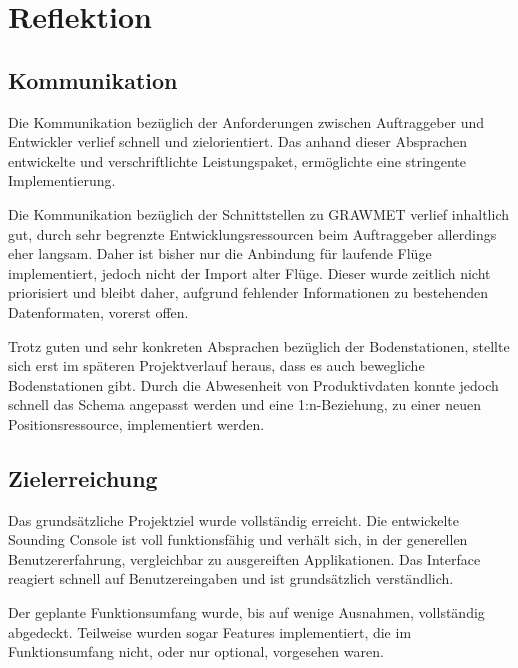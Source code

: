 \section{Reflektion}

\subsection{Kommunikation}
Die Kommunikation bezüglich der Anforderungen zwischen Auftraggeber und Entwickler verlief schnell und zielorientiert.
Das anhand dieser Absprachen entwickelte und verschriftlichte Leistungspaket, ermöglichte eine stringente Implementierung.

Die Kommunikation bezüglich der Schnittstellen zu GRAWMET verlief inhaltlich gut, durch sehr begrenzte Entwicklungsressourcen beim Auftraggeber allerdings eher langsam.
Daher ist bisher nur die Anbindung für laufende Flüge implementiert, jedoch nicht der Import alter Flüge.
Dieser wurde zeitlich nicht priorisiert und bleibt daher, aufgrund fehlender Informationen zu bestehenden Datenformaten, vorerst offen.

Trotz guten und sehr konkreten Absprachen bezüglich der Bodenstationen, stellte sich erst im späteren Projektverlauf heraus, dass es auch bewegliche Bodenstationen gibt.
Durch die Abwesenheit von Produktivdaten konnte jedoch schnell das Schema angepasst werden und eine 1:n-Beziehung, zu einer neuen Positionsressource, implementiert werden.

\subsection{Zielerreichung}
Das grundsätzliche Projektziel wurde vollständig erreicht.
Die entwickelte Sounding Console ist voll funktionsfähig und verhält sich, in der generellen Benutzererfahrung, vergleichbar zu ausgereiften Applikationen.
Das Interface reagiert schnell auf Benutzereingaben und ist grundsätzlich verständlich.

Der geplante Funktionsumfang wurde, bis auf wenige Ausnahmen, vollständig abgedeckt.
Teilweise wurden sogar Features implementiert, die im Funktionsumfang nicht, oder nur optional, vorgesehen waren.
